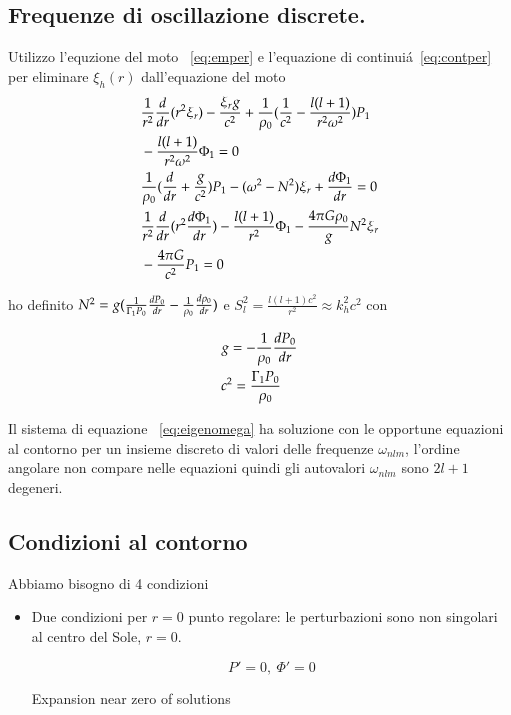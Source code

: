 \documentclass[oneside,12pt,fleqn]{memoir}
\begin{document}
{\subsection{Frequenze di oscillazione discrete.}

Utilizzo l'equzione del moto ~\ref{eq:emper} e l'equazione di continui\'a~\ref{eq:contper} per eliminare $\xi_h(r)$ dall'equazione del moto
\begin{align}
&\frac{1}{r^2}\TDof{r}(r^2\xi_r)-\frac{\xi_rg}{c^2}+\frac{1}{\rho_0}(\frac{1}{c^2}-\frac{l(l+1)}{r^2\omega^2})P_1\nonumber\\
&-\frac{l(l+1)}{r^2\omega^2}\Phi_1=0\nonumber\\
&\frac{1}{\rho_0}(\TDof{r}+\frac{g}{c^2})P_1-(\omega^2-N^2)\xi_r+\TDy{r}{\Phi_1}=0\label{eq:eigenomega}\\
&\frac{1}{r^2}\TDof{r}(r^2\TDy{r}{\Phi_1})-\frac{l(l+1)}{r^2}\Phi_1-\frac{4\pi G\rho_0}{g}N^2\xi_r\nonumber\\
&-\frac{4\pi G}{c^2}P_1=0\nonumber
\end{align}

ho definito $N^2=g(\frac{1}{\Gamma_1P_0}\TDy{r}{P_0}-\frac{1}{\rho_0}\TDy{r}{\rho_0})$ e $S_l^2=\frac{l(l+1)c^2}{r^2}\approx k_h^2c^2$ con

\begin{align*}
&g=-\frac{1}{\rho_0}\TDy{r}{P_0}\\
&c^2=\frac{\Gamma_1P_0}{\rho_0}
\end{align*}


Il sistema di equazione ~\ref{eq:eigenomega} ha soluzione con le opportune equazioni al contorno per un insieme discreto di valori delle frequenze $\omega_{nlm}$, l'ordine angolare non compare nelle equazioni quindi gli autovalori $\omega_{nlm}$ sono $2l+1$ degeneri.

\subsection{Condizioni al contorno}

Abbiamo bisogno di 4 condizioni

\begin{itemize}
\item Due condizioni per $r=0$ punto regolare: le perturbazioni sono non singolari al centro del Sole, $r=0$.

\begin{equation*}
P'=0,\ \Phi'=0
\end{equation*}

Expansion near zero of solutions


\end{itemize}}
\end{document}
